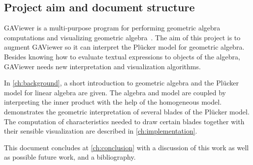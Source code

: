 %


\subsection{Project aim and document structure}

GAViewer is a multi-purpose program for performing geometric algebra computations and visualizing geometric algebra~\cite{GAViewer}.  The aim of this project is to augment GAViewer so it can interpret the Pl\"ucker model for geometric algebra.  Besides knowing how to evaluate textual expressions to objects of the algebra, GAViewer needs new interpretation and visualization algorithms.

In \autoref{ch:background}, a short introduction to geometric algebra and the Pl\"ucker model for linear algebra are given.  The algebra and model are coupled by interpreting the inner product with the help of the homogeneous model.   demonstrates the geometric interpretation of several blades of the Pl\"ucker model.  The computation of characteristics needed to draw certain blades together with their sensible visualization are described in \autoref{ch:implementation}.

This document concludes at \autoref{ch:conclusion} with a discussion of this work as well as possible future work, and a bibliography.
